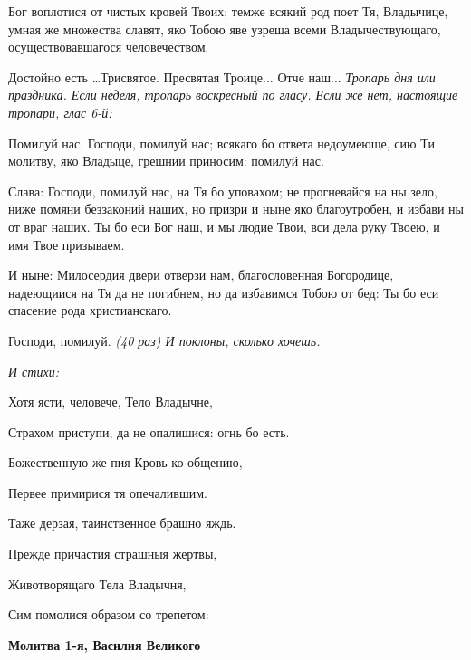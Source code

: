 Бог воплотися от чистых кровей Твоих; темже всякий род поет Тя, Владычице, умная же множества славят, яко Тобою яве узреша всеми Владычествующаго, осуществовавшагося человечеством.

\medskip
Достойно есть …Трисвятое. Пресвятая Троице... Отче наш... \itshape Тропарь дня или праздника.\normalfont{} \itshape Если неделя, тропарь воскресный по гласу. Если же нет, настоящие тропари, глас 6-й:\normalfont{}


Помилуй нас, Господи, помилуй нас; всякаго бо ответа недоумеюще, сию Ти молитву, яко Владыце, грешнии приносим: помилуй нас.


Слава: Господи, помилуй нас, на Тя бо уповахом; не прогневайся на ны зело, ниже помяни беззаконий наших, но призри и ныне яко благоутробен, и избави ны от враг наших. Ты бо еси Бог наш, и мы людие Твои, вси дела руку Твоею, и имя Твое призываем.


И ныне: Милосердия двери отверзи нам, благословенная Богородице, надеющиися на Тя да не погибнем, но да избавимся Тобою от бед: Ты бо еси спасение рода христианскаго.


Господи, помилуй. \itshape (40 раз)\normalfont{} \itshape И поклоны, сколько хочешь.


\normalfont{}


\itshape И стихи:\normalfont{}


Хотя ясти, человече, Тело Владычне,


Страхом приступи, да не опалишися: огнь бо есть.


Божественную же пия Кровь ко общению,


Первее примирися тя опечалившим.


Таже дерзая, таинственное брашно яждь.


Прежде причастия страшныя жертвы,


Животворящаго Тела Владычня,


Сим помолися образом со трепетом:


\medskip
\bfseries Молитва 1-я, Василия Великого\normalfont{}


